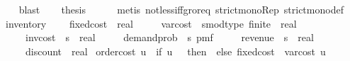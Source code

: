 \begin{isabellebody}
\ {}\ \isamarkupfalse%
\ blast\isanewline
\ \ \isamarkupfalse%
\ {\isacharquery}{\kern0pt}thesis\isanewline
\ \ \ \ \isamarkupfalse%
\ {\isacharparenleft}{\kern0pt}metis\ not{\isacharunderscore}{\kern0pt}less{\isacharunderscore}{\kern0pt}iff{\isacharunderscore}{\kern0pt}gr{\isacharunderscore}{\kern0pt}or{\isacharunderscore}{\kern0pt}eq\ strict{\isacharunderscore}{\kern0pt}mono{\isacharunderscore}{\kern0pt}Rep\ strict{\isacharunderscore}{\kern0pt}mono{\isacharunderscore}{\kern0pt}def{\isacharparenright}{\kern0pt}\isanewline
{}\isamarkupfalse%
%
\endisatagproof
{\isafoldproof}%
%
\isadelimproof
\isanewline
%
\endisadelimproof
\isanewline
{}\isamarkupfalse%
\ inventory\ {\isacharequal}{\kern0pt}\isanewline
\ \ \ fixed{\isacharunderscore}{\kern0pt}cost\ {\isacharcolon}{\kern0pt}{\isacharcolon}{\kern0pt}\ real\isanewline
\ \ \ \ \ var{\isacharunderscore}{\kern0pt}cost\ {\isacharcolon}{\kern0pt}{\isacharcolon}{\kern0pt}\ {\isachardoublequoteopen}{\isacharprime}{\kern0pt}s{\isacharcolon}{\kern0pt}{\isacharcolon}{\kern0pt}{\isacharbraceleft}{\kern0pt}mod{\isacharunderscore}{\kern0pt}type{\isacharcomma}{\kern0pt}\ finite{\isacharbraceright}{\kern0pt}\ {\isasymRightarrow}\ real{\isachardoublequoteclose}\isanewline
\ \ \ \ \ inv{\isacharunderscore}{\kern0pt}cost\ {\isacharcolon}{\kern0pt}{\isacharcolon}{\kern0pt}\ {\isachardoublequoteopen}{\isacharprime}{\kern0pt}s\ {\isasymRightarrow}\ real{\isachardoublequoteclose}\isanewline
\ \ \ \ \ demand{\isacharunderscore}{\kern0pt}prob\ {\isacharcolon}{\kern0pt}{\isacharcolon}{\kern0pt}\ {\isachardoublequoteopen}{\isacharprime}{\kern0pt}s\ pmf{\isachardoublequoteclose}\isanewline
\ \ \ \ \ revenue\ {\isacharcolon}{\kern0pt}{\isacharcolon}{\kern0pt}\ {\isachardoublequoteopen}{\isacharprime}{\kern0pt}s\ {\isasymRightarrow}\ real{\isachardoublequoteclose}\isanewline
\ \ \ \ \ discount\ {\isacharcolon}{\kern0pt}{\isacharcolon}{\kern0pt}\ {\isachardoublequoteopen}real{\isachardoublequoteclose}\isanewline
{}\isanewline
{}\isamarkupfalse%
\ {\isachardoublequoteopen}order{\isacharunderscore}{\kern0pt}cost\ u\ {\isacharequal}{\kern0pt}\ {\isacharparenleft}{\kern0pt}if\ u\ {\isacharequal}{\kern0pt}\ {}\ then\ {}\ else\ fixed{\isacharunderscore}{\kern0pt}cost\ {\isacharplus}{\kern0pt}\ var{\isacharunderscore}{\kern0pt}cost\ u{\isacharparenright}{\kern0pt}{\isachardoublequoteclose}\ \isanewline

\end{isabellebody}
